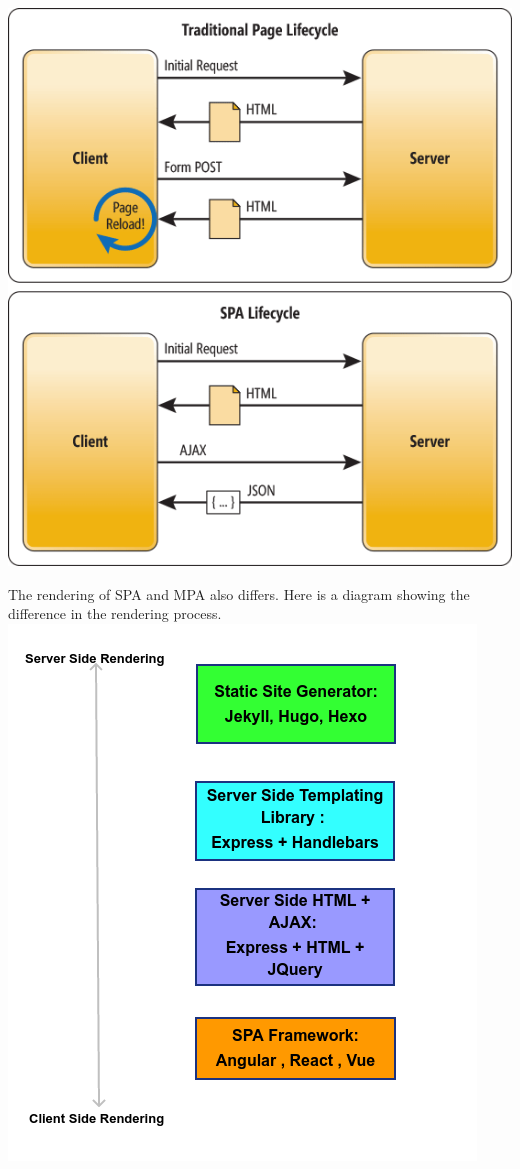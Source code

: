 \documentclass[a4paper]{article}
\begin{document}
\includegraphics[scale = 0.5]{img/spa_vs_mpa.png}

The rendering of SPA and MPA also differs. Here is a diagram showing the difference in the rendering process.\\

\includegraphics{img/rendering.png}
\end{document}
